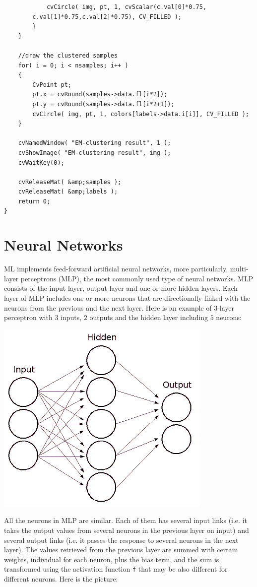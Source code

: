 \begin{lstlisting}
            cvCircle( img, pt, 1, cvScalar(c.val[0]*0.75,
		c.val[1]*0.75,c.val[2]*0.75), CV_FILLED );
        }
    }

    //draw the clustered samples
    for( i = 0; i < nsamples; i++ )
    {
        CvPoint pt;
        pt.x = cvRound(samples->data.fl[i*2]);
        pt.y = cvRound(samples->data.fl[i*2+1]);
        cvCircle( img, pt, 1, colors[labels->data.i[i]], CV_FILLED );
    }

    cvNamedWindow( "EM-clustering result", 1 );
    cvShowImage( "EM-clustering result", img );
    cvWaitKey(0);

    cvReleaseMat( &amp;samples );
    cvReleaseMat( &amp;labels );
    return 0;
}

\end{lstlisting}

\section{Neural Networks}

ML implements feed-forward artificial neural networks, more particularly, multi-layer perceptrons (MLP), the most commonly used type of neural networks. MLP consists of the input layer, output layer and one or more hidden layers. Each layer of MLP includes one or more neurons that are directionally linked with the neurons from the previous and the next layer. Here is an example of $3$-layer perceptron with $3$ inputs, $2$ outputs and the hidden layer including $5$ neurons:

\includegraphics{pics/mlp_.png}

All the neurons in MLP are similar. Each of them has several input links (i.e. it takes the output values from several neurons in the previous layer on input) and several output links (i.e. it passes the response to several neurons in the next layer). The values retrieved from the previous layer are summed with certain weights, individual for each neuron, plus the bias term, and the sum is transformed using the activation function \texttt{f} that may be also different for different neurons. Here is the picture:

